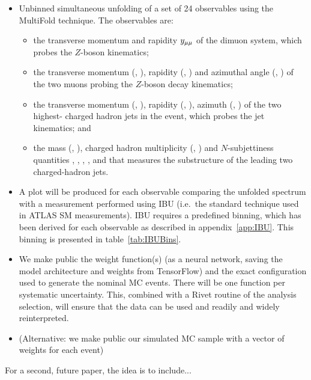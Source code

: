 \begin{itemize}
\item
  Unbinned simultaneous unfolding of a set of 24 observables using the MultiFold technique.
  The observables are:
  \begin{itemize}
    \item
      the transverse momentum \ptll{} and rapidity $y_{\mu\mu}$ of the dimuon system, which probes the $Z$-boson kinematics;
    \item
      the transverse momentum (\ptlm, \ptsm),
      rapidity (\ylm{}, \ysm) and azimuthal angle (\philm, \phism) of the two muons probing the $Z$-boson decay kinematics;
    \item
      the transverse momentum (\ptlj, \ptsj), rapidity (\ylj{}, \ysj), azimuth (\philj, \phisj) of the two highest-\pt{} charged hadron jets in the event, which probes the jet kinematics; and
    \item
      the mass (\mlj, \msj), charged hadron multiplicity (\Nclj, \Ncsj) and $N$-subjettiness quantities , %
      , , ,  and  that measures the substructure of the leading two charged-hadron jets. 
  \end{itemize}  
\item
   A plot will be produced for each observable comparing the unfolded spectrum with a measurement performed using IBU (i.e.\ the standard technique used in ATLAS SM measurements).
   IBU requires a predefined binning, which has been derived for each observable as described in appendix~\ref{app:IBU}. This binning is presented in table~\ref{tab:IBUBins}.
\item
  We make public the weight function(s) (as a neural network, saving the model architecture and weights from TensorFlow) and the exact configuration used to generate the nominal MC events.  There will be one function per systematic uncertainty.  This, combined with a Rivet routine of the analysis selection, will ensure that the data can be used and readily and widely reinterpreted.
\item (Alternative: we make public our simulated MC sample with a vector of weights for each event)
\end{itemize}


For a second, future paper, the idea is to include...
